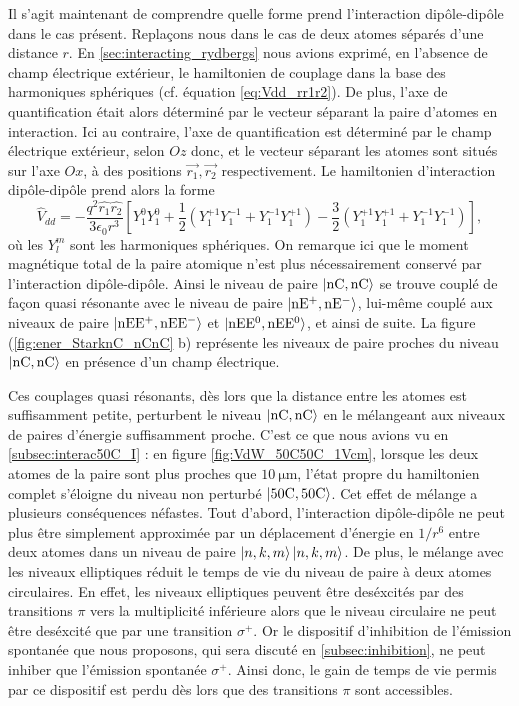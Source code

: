 Il s'agit maintenant de comprendre quelle forme prend l'interaction dipôle-dipôle dans le cas présent.
Replaçons nous dans le cas de deux atomes séparés d'une distance $r$.
En \ref{sec:interacting_rydbergs} nous avions exprimé, en l'absence de champ électrique extérieur, le hamiltonien de couplage dans la base des harmoniques sphériques (cf. équation \eqref{eq:Vdd_rr1r2}).
De plus, l'axe de quantification était alors déterminé par le vecteur séparant la paire d'atomes en interaction.
Ici au contraire, l'axe de quantification est déterminé par le champ électrique extérieur, selon $Oz$ donc, et le vecteur séparant les atomes sont situés sur l'axe $Ox$, à des positions $\vec{r_1},\vec{r_2}$ respectivement.
Le hamiltonien d'interaction dipôle-dipôle prend alors la forme
\begin{equation}
\label{eq:dipdip_nC}
\hat{V}_{dd} = -\frac{q^2\hat{r_1} \hat{r_2}}{3\epsilon_0 r^3}
\left[ Y_1^0 Y_1^0 + \frac{1}{2} \left( Y_1^{+1}Y_1^{-1} + Y_1^{-1}Y_1^{+1} \right)
- \frac{3}{2} \left(  Y_1^{+1}Y_1^{+1} + Y_1^{-1}Y_1^{-1} \right) \right],
\end{equation}
où les $Y_l^m$ sont les harmoniques sphériques.
On remarque ici que le moment magnétique total de la paire atomique n'est plus nécessairement conservé par l'interaction dipôle-dipôle.
Ainsi le niveau de paire $\ket{\mathrm{nC},\mathrm{nC}}$ se trouve couplé de façon quasi résonante avec le niveau de paire $\ket{\mathrm{nE^+},\mathrm{nE^-}}$, lui-même couplé aux niveaux de paire $\ket{\mathrm{nEE^+},\mathrm{nEE^-}}$ et $\ket{\mathrm{nEE^0},\mathrm{nEE^0}}$, et ainsi de suite.
La figure (\ref{fig:ener_StarknC_nCnC} b) représente les niveaux de paire proches du niveau $\ket{\mathrm{nC},\mathrm{nC}}$ en présence d'un champ électrique.

Ces couplages quasi résonants, dès lors que la distance entre les atomes est suffisamment petite, perturbent le niveau $\ket{\mathrm{nC,nC}}$ en le mélangeant aux niveaux de paires d'énergie suffisamment proche.
C'est ce que nous avions vu en \ref{subsec:interac50C_I} : en figure \eqref{fig:VdW_50C50C_1Vcm}, lorsque les deux atomes de la paire sont plus proches que $\SI{10}{\um}$, l'état propre du hamiltonien complet s'éloigne du niveau non perturbé $\ket{\mathrm{50C,50C}}$.
Cet effet de mélange a plusieurs conséquences néfastes.
Tout d'abord, l'interaction dipôle-dipôle ne peut plus être simplement approximée par un déplacement d'énergie en $1/r^6$ entre deux atomes dans un niveau de paire $\ket{n,k,m}\ket{n,k,m}$.
De plus, le mélange avec les niveaux elliptiques réduit le temps de vie du niveau de paire à deux atomes circulaires.
En effet, les niveaux elliptiques peuvent être deséxcités par des transitions $\pi$ vers la multiplicité inférieure alors que le niveau circulaire ne peut être deséxcité que par une transition $\sigma^+$.
Or le dispositif d'inhibition de l'émission spontanée que nous proposons, qui sera discuté en \ref{subsec:inhibition}, ne peut inhiber que l'émission spontanée $\sigma^+$.
Ainsi donc, le gain de temps de vie permis par ce dispositif est perdu dès lors que des transitions $\pi$ sont accessibles.

